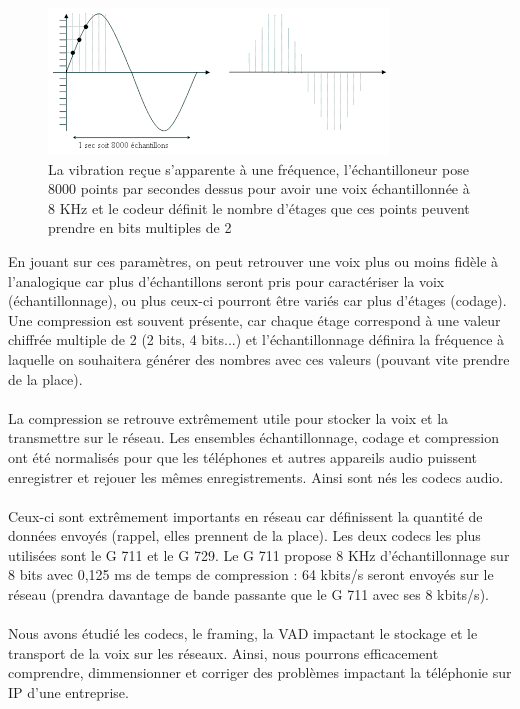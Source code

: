 \begin{figure}[hp]
    \centering
    \includegraphics[width=\textwidth - \textwidth / 5]{ressources/r3rom16/00.png}
    \caption{La vibration reçue s'apparente à une fréquence, l'échantilloneur pose 8000 points par secondes dessus pour avoir une voix échantillonnée à 8 KHz et le codeur définit le nombre d'étages que ces points peuvent prendre en bits multiples de 2}
    \label{fig:echantillonnage}
\end{figure}

\noindent En jouant sur ces paramètres, on peut retrouver une voix plus ou moins fidèle à l'analogique car plus d'échantillons seront pris pour caractériser la voix (échantillonnage), ou plus ceux-ci pourront être variés car plus d'étages (codage). Une compression est souvent présente, car chaque étage correspond à une valeur chiffrée multiple de 2 (2 bits, 4 bits...) et l'échantillonnage définira la fréquence à laquelle on souhaitera générer des nombres avec ces valeurs (pouvant vite prendre de la place).
\\ \\
La compression se retrouve extrêmement utile pour stocker la voix et la transmettre sur le réseau. Les ensembles échantillonnage, codage et compression ont été normalisés pour que les téléphones et autres appareils audio puissent enregistrer et rejouer les mêmes enregistrements. Ainsi sont nés les codecs audio.
\\ \\
Ceux-ci sont extrêmement importants en réseau car définissent la quantité de données envoyés (rappel, elles prennent de la place). Les deux codecs les plus utilisées sont le G 711 et le G 729. Le G 711 propose 8 KHz d'échantillonnage sur 8 bits avec 0,125 ms de temps de compression : 64 kbits/s seront envoyés sur le réseau (prendra davantage de bande passante que le G 711 avec ses 8 kbits/s).
\\ \\
Nous avons étudié les codecs, le framing, la VAD impactant le stockage et le transport de la voix sur les réseaux. Ainsi, nous pourrons efficacement comprendre, dimmensionner et corriger des problèmes impactant la téléphonie sur IP d'une entreprise.

